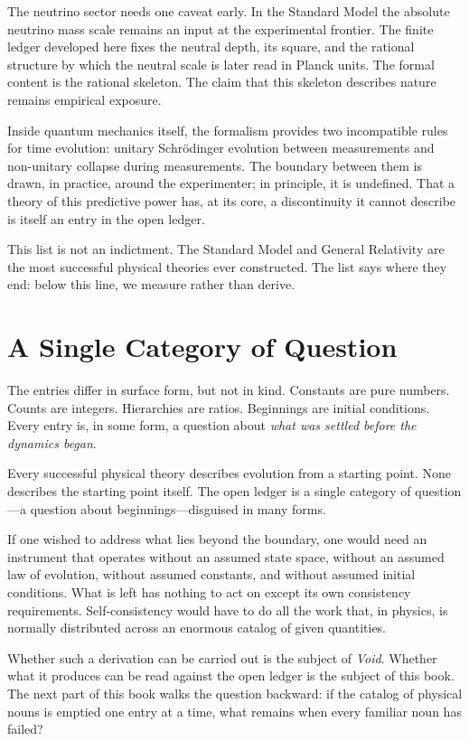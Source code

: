 \documentclass[11pt,a4paper]{book}
\begin{document}
The neutrino sector needs one caveat early. In the Standard Model the
absolute neutrino mass scale remains an input at the experimental frontier.
The finite ledger developed here fixes the neutral depth, its square, and the
rational structure by which the neutral scale is later read in Planck units.
The formal content is the rational skeleton.  The claim that this skeleton
describes nature remains empirical exposure.

Inside quantum mechanics itself, the formalism provides two incompatible rules for time evolution: unitary Schr\"odinger evolution between measurements and non-unitary collapse during measurements.  The boundary between them is drawn, in practice, around the experimenter; in principle, it is undefined.  That a theory of this predictive power has, at its core, a discontinuity it cannot describe is itself an entry in the open ledger.

This list is not an indictment.  The Standard Model and General Relativity are the most successful physical theories ever constructed.  The list says where they end: below this line, we measure rather than derive.

\section*{A Single Category of Question}

The entries differ in surface form, but not in kind.  Constants are pure numbers.  Counts are integers.  Hierarchies are ratios.  Beginnings are initial conditions.  Every entry is, in some form, a question about \emph{what was settled before the dynamics began}.

Every successful physical theory describes evolution from a starting point.  None describes the starting point itself.  The open ledger is a single category of question---a question about beginnings---disguised in many forms.

If one wished to address what lies beyond the boundary, one would need an instrument that operates without an assumed state space, without an assumed law of evolution, without assumed constants, and without assumed initial conditions.  What is left has nothing to act on except its own consistency requirements.  Self-consistency would have to do all the work that, in physics, is normally distributed across an enormous catalog of given quantities.

Whether such a derivation can be carried out is the subject of \textit{Void}.  Whether what it produces can be read against the open ledger is the subject of this book.  The next part of this book walks the question backward: if the catalog of physical nouns is emptied one entry at a time, what remains when every familiar noun has failed?
\end{document}
